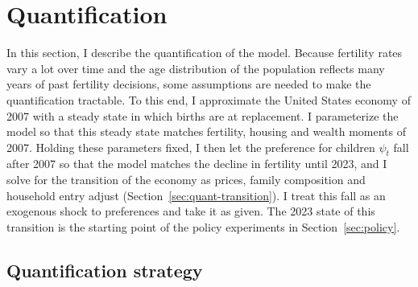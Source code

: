 
\section{Quantification}
\label{sec:quant}

In this section, I describe the quantification of the model. Because
fertility rates vary a lot over time and the age distribution of the
population reflects many years of past fertility decisions, some assumptions
are needed to make the quantification tractable. To this end, I approximate
the United States economy of 2007 with a steady state in which births are at
replacement. I parameterize the model so that this steady state matches
fertility, housing and wealth moments of 2007. Holding these parameters
fixed, I then let the preference for children $\psi_t$ fall after 2007 so
that the model matches the decline in fertility until 2023, and I solve for
the transition of the economy as prices, family composition and household
entry adjust (Section~\ref{sec:quant-transition}). I treat this fall as an
exogenous shock to preferences and take it as given. The 2023 state of this
transition is the starting point of the policy experiments in
Section~\ref{sec:policy}.

\subsection{Quantification strategy}
\label{sec:quant-approach}

